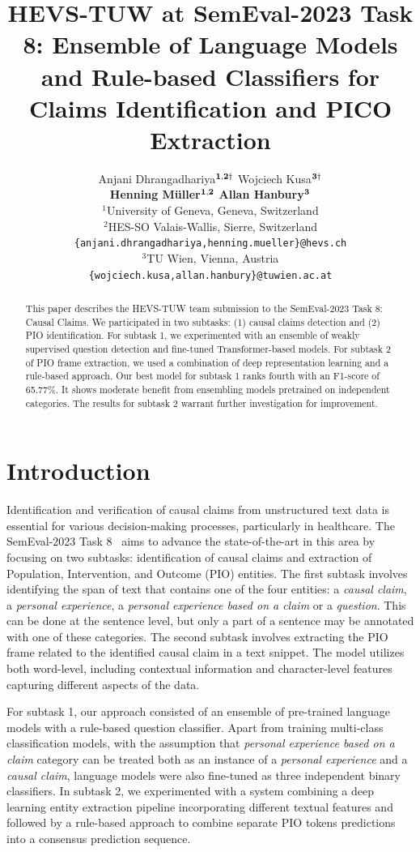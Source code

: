 \documentclass[11pt]{article}
\title{HEVS-TUW at SemEval-2023 Task 8: Ensemble of Language Models and Rule-based Classifiers for Claims Identification and PICO Extraction}
\author{Anjani Dhrangadhariya\hspace{1pt}$^{{{\bf 1,2}}\dag}$ \hspace{.7cm} Wojciech Kusa\hspace{1pt}$^{{\bf 3}\dag}$ \\[0.15cm] {\bf Henning Müller\hspace{1pt}$^{{\bf 1,2}}$}  \hspace{.7cm}  {\bf Allan Hanbury\hspace{1pt}$^{{\bf 3}}$}
\\[0.4cm]
{$^1$University of Geneva, Geneva, Switzerland} \\
{$^2$HES-SO Valais-Wallis, Sierre, Switzerland} \\
{\tt \{anjani.dhrangadhariya,henning.mueller\}@hevs.ch} \\
{$^3$TU Wien, Vienna, Austria} \\
{\tt \{wojciech.kusa,allan.hanbury\}@tuwien.ac.at} \\
}
\begin{document}
\maketitle
{\let\thefootnote\relax{}}

\begin{abstract}
This paper describes the HEVS-TUW team submission to the SemEval-2023 Task 8: Causal Claims.
We participated in two subtasks: (1) causal claims detection and (2)  PIO identification.
For subtask 1, we experimented with an ensemble of weakly supervised question detection and fine-tuned Transformer-based models.
For subtask 2 of PIO frame extraction, we used a combination of deep representation learning and a rule-based approach. 
Our best model for subtask 1 ranks fourth with an F1-score of 65.77\%.
It shows moderate benefit from ensembling models pretrained on independent categories.
The results for subtask 2 warrant further investigation for improvement.
\end{abstract}
%
\section{Introduction}
\label{sec:intro}
%
% 
Identification and verification of causal claims from unstructured text data is essential for various decision-making processes, particularly in healthcare. The SemEval-2023 Task 8~\cite{khetan-EtAl:2023:SemEval} aims to advance the state-of-the-art in this area by focusing on two subtasks: identification of causal claims and extraction of Population, Intervention, and Outcome (PIO) entities.
% 
The first subtask involves identifying the span of text that contains one of the four entities: a \emph{causal claim}, a \emph{personal experience}, a \emph{personal experience based on a claim} or a \emph{question}. 
This can be done at the sentence level, but only a part of a sentence may be annotated with one of these categories. 
The second subtask involves extracting the PIO frame related to the identified causal claim in a text snippet.
The model utilizes both word-level, including contextual information and character-level features capturing different aspects of the data.


For subtask 1, our approach consisted of an ensemble of pre-trained language models with a rule-based question classifier. 
Apart from training multi-class classification models, with the assumption that \emph{personal experience based on a claim} category can be treated both as an instance of a \emph{personal experience} and a \emph{causal claim}, language models were also fine-tuned as three independent binary classifiers.
In subtask 2, we experimented with a system combining a deep learning entity extraction pipeline incorporating different textual features and followed by a rule-based approach to combine separate PIO tokens predictions into a consensus prediction sequence.
\end{document}
